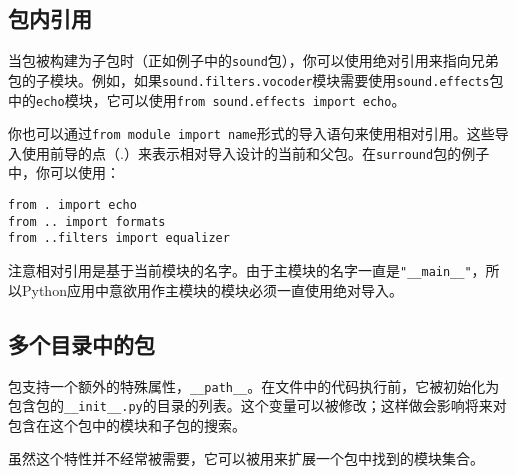 \documentclass[../modules.tex]{subfiles}
\begin{document}
\subsection{包内引用}

当包被构建为子包时（正如例子中的\lstinline{sound}包），你可以使用绝对引用来指向兄弟包的子模块。例如，如果\lstinline{sound.filters.vocoder}模块需要使用\lstinline{sound.effects}包中的\lstinline{echo}模块，它可以使用\lstinline{from sound.effects import echo}。

你也可以通过\lstinline{from module import name}形式的导入语句来使用相对引用。这些导入使用前导的点（.）来表示相对导入设计的当前和父包。在\lstinline{surround}包的例子中，你可以使用：
\begin{lstlisting}
from . import echo
from .. import formats
from ..filters import equalizer
\end{lstlisting}
注意相对引用是基于当前模块的名字。由于主模块的名字一直是\lstinline{"__main__"}，所以Python应用中意欲用作主模块的模块必须一直使用绝对导入。

\subsection{多个目录中的包}

包支持一个额外的特殊属性，\lstinline{__path__}。在文件中的代码执行前，它被初始化为包含包的\lstinline{__init__.py}的目录的列表。这个变量可以被修改；这样做会影响将来对包含在这个包中的模块和子包的搜索。

虽然这个特性并不经常被需要，它可以被用来扩展一个包中找到的模块集合。
\end{document}

